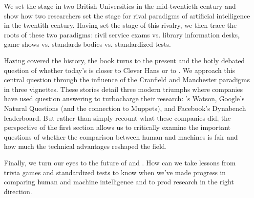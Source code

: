 We set the stage in two British Universities in the mid-twentieth
century and show how two researchers set the stage for rival paradigms
of artificial intelligence in the twentith century.
%
Having set the stage of this rivalry, we then trace the roots of these
two paradigms: civil service exams vs. library information desks, game
shows vs. standards bodies vs. standardized tests.

Having covered the history, the book turns to the present and the
hotly debated question of whether today's  is closer to Clever
Hans or to .
%
We approach this central question through the
influence of the Cranfield and Manchester paradigms in three vignettes.
%
These stories detail three modern  triumphs where companies
have used question answering to turbocharge their 
research: 's Watson, Google's Natural Questions (and the connection to Muppets), and
Facebook's Dynabench leaderboard.
%
But rather than simply recount what these companies did, the
perspective of the first section allows us to critically examine the
important questions of whether the comparison between human and
machines is fair and how much the technical advantages reshaped the
field.

Finally, we turn our eyes to the future of  and .
%
How can we take lessons from trivia games and standardized tests to know
when we've made progress in comparing human and machine intelligence
and to prod research in the right direction.

